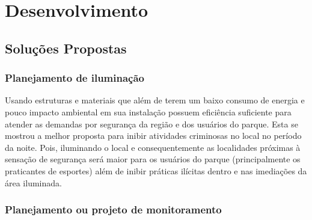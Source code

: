\chapter[Desenvolvimento]{Desenvolvimento}

\section{Solu\c{c}\~oes Propostas}

\subsection{Planejamento de ilumina\c{c}\~ao}

Usando estruturas e materiais que al\'em de terem um baixo consumo de energia e pouco impacto ambiental em sua instala\c{c}\~ao possuem efici\^encia suficiente para atender as demandas por seguran\c{c}a da regi\~ao e dos usu\'arios do parque. Esta se mostrou a melhor proposta para  inibir atividades criminosas no local no per\'iodo da noite. Pois, iluminando o local e consequentemente as localidades pr\'oximas \`a sensa\c{c}\~ao de seguran\c{c}a ser\'a maior para os usu\'arios do parque (principalmente os praticantes de esportes) al\'em de inibir pr\'aticas il\'icitas dentro e nas imedia\c{c}\~oes da \'area iluminada.

\subsection{Planejamento ou projeto de monitoramento}

